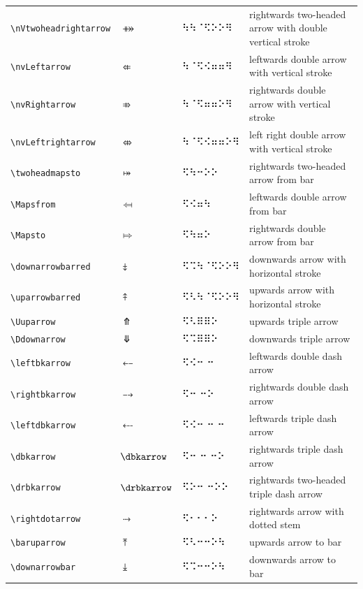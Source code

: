 \documentclass[oneside]{article}
\begin{document}
\begin{longtable}{llll}
\verb|\nVtwoheadrightarrow| & $\nVtwoheadrightarrow$ &   ⠳⠳⠈⠫⠕⠕⠻   & {rightwards two-headed arrow with double vertical stroke} \\[2ex]
\verb|\nvLeftarrow| & $\nvLeftarrow$ &   ⠳⠈⠫⠪⠶⠶⠻   & {leftwards double arrow with vertical stroke} \\[2ex]
\verb|\nvRightarrow| & $\nvRightarrow$ &   ⠳⠈⠫⠶⠶⠕⠻   & {rightwards double arrow with vertical stroke} \\[2ex]
\verb|\nvLeftrightarrow| & $\nvLeftrightarrow$ &   ⠳⠈⠫⠪⠶⠶⠕⠻   & {left right double arrow with vertical stroke} \\[2ex]
\verb|\twoheadmapsto| & $\twoheadmapsto$ &   ⠫⠳⠒⠕⠕   & {rightwards two-headed arrow from bar} \\[2ex]
\verb|\Mapsfrom| & $\Mapsfrom$ &   ⠫⠪⠶⠳   & {leftwards double arrow from bar} \\[2ex]
\verb|\Mapsto| & $\Mapsto$ &   ⠫⠳⠶⠕   & {rightwards double arrow from bar} \\[2ex]
\verb|\downarrowbarred| & $\downarrowbarred$ &   ⠫⠩⠳⠈⠫⠕⠕⠻   & {downwards arrow with horizontal stroke} \\[2ex]
\verb|\uparrowbarred| & $\uparrowbarred$ &   ⠫⠣⠳⠈⠫⠕⠕⠻   & {upwards arrow with horizontal stroke} \\[2ex]
\verb|\Uuparrow| & $\Uuparrow$ &   ⠫⠣⠿⠿⠕   & {upwards triple arrow} \\[2ex]
\verb|\Ddownarrow| & $\Ddownarrow$ &   ⠫⠩⠿⠿⠕   & {downwards triple arrow} \\[2ex]
\verb|\leftbkarrow| & $\leftbkarrow$ &   ⠫⠪⠒ ⠒   & {leftwards double dash arrow} \\[2ex]
\verb|\rightbkarrow| & $\rightbkarrow$ &   ⠫⠒ ⠒⠕   & {rightwards double dash arrow} \\[2ex]
\verb|\leftdbkarrow| & $\leftdbkarrow$ &   ⠫⠪⠒ ⠒ ⠒   & {leftwards triple dash arrow} \\[2ex]
\verb|\dbkarrow| & $\dbkarrow$ &   ⠫⠒ ⠒ ⠒⠕   & {rightwards triple dash arrow} \\[2ex]
\verb|\drbkarrow| & $\drbkarrow$ &   ⠫⠕⠒ ⠒⠕⠕   & {rightwards two-headed triple dash arrow} \\[2ex]
\verb|\rightdotarrow| & $\rightdotarrow$ &   ⠫⠂⠂⠂⠕   & {rightwards arrow with dotted stem} \\[2ex]
\verb|\baruparrow| & $\baruparrow$ &   ⠫⠣⠒⠒⠕⠳   & {upwards arrow to bar} \\[2ex]
\verb|\downarrowbar| & $\downarrowbar$ &   ⠫⠩⠒⠒⠕⠳   & {downwards arrow to bar} \\[2ex]

\end{longtable}
\end{document}
